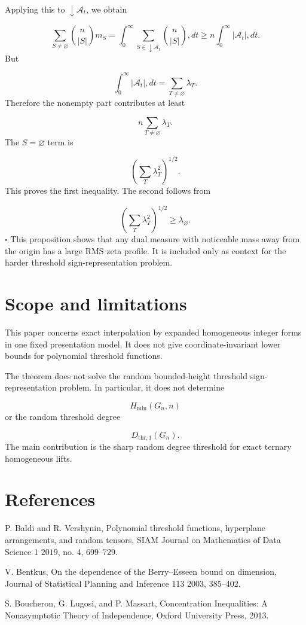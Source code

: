 \documentclass[11pt]{article}
\theoremstyle{definition}
\begin{document}
Applying this to $\downarrow\mathcal A_t$, we obtain

\[
\sum_{S\ne\varnothing}\binom n{|S|}m_S
=
\int_0^\infty
\sum_{S\in\downarrow\mathcal A_t}
\binom n{|S|},dt
\ge
n\int_0^\infty|\mathcal A_t|,dt.
\]
But

\[
\int_0^\infty|\mathcal A_t|,dt
=
\sum_{T\ne\varnothing}\lambda_T.
\]
Therefore the nonempty part contributes at least

\[
n\sum_{T\ne\varnothing}\lambda_T.
\]
The $S=\varnothing$ term is

\[
\left(\sum_T\lambda_T^2\right)^{1/2}.
\]
This proves the first inequality. The second follows from

\[
\left(\sum_T\lambda_T^2\right)^{1/2}
\ge\lambda_\varnothing.
\]
\(\square\)
This proposition shows that any dual measure with noticeable mass away from the origin has a large RMS zeta profile. It is included only as context for the harder threshold sign-representation problem.

\section{Scope and limitations}
This paper concerns exact interpolation by expanded homogeneous integer forms in one fixed presentation model. It does not give coordinate-invariant lower bounds for polynomial threshold functions.

The theorem does not solve the random bounded-height threshold sign-representation problem. In particular, it does not determine

\[
H_{\min}(G_n,n)
\]
or the random threshold degree

\[
D_{\mathrm{thr},1}(G_n).
\]
The main contribution is the sharp random degree threshold for exact ternary homogeneous lifts.

\section*{References}
P. Baldi and R. Vershynin, Polynomial threshold functions, hyperplane arrangements, and random tensors, SIAM Journal on Mathematics of Data Science 1 $2019$, no. 4, 699--729.

V. Bentkus, On the dependence of the Berry--Esseen bound on dimension, Journal of Statistical Planning and Inference 113 $2003$, 385--402.

S. Boucheron, G. Lugosi, and P. Massart, Concentration Inequalities: A Nonasymptotic Theory of Independence, Oxford University Press, 2013.
\end{document}
